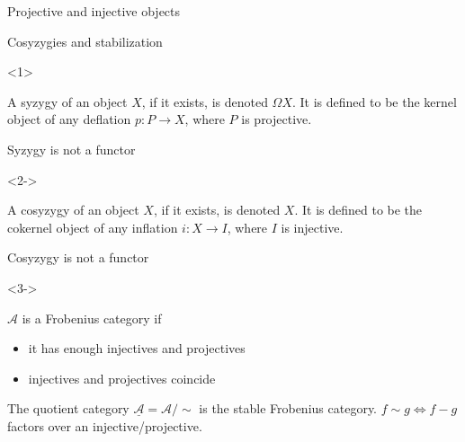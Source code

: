 \documentclass{beamer}
\newcommand{\upside}[1]{\rotatebox[origin=c]{180}{#1}}
\begin{document}
\begin{frame}{Projective and injective objects}
\begin{onlyenv}
\begin{lemma}
                        \begin{center}
                        \end{center}
                    \end{lemma}
                \end{onlyenv}
            \end{frame}
            \begin{frame}{Cosyzygies and stabilization}
                \begin{onlyenv}<1>
                    \begin{definition}[Zysygy]
                        A syzygy of an object $X$, if it exists, is denoted $\Omega X$. It is defined to be the kernel object of any deflation $p:P\rightarrow X$, where $P$ is projective.
                    \end{definition}
                    \alert<1>{Syzygy is not a functor}
                \end{onlyenv}
                \begin{onlyenv}<2->
                    \begin{definition}[Cosyzygy]
                        A cosyzygy of an object $X$, if it exists, is denoted \upside{$\Omega$}$X$. It is defined to be the cokernel object of any inflation $i:X\rightarrow I$, where $I$ is injective.
                    \end{definition}
                    \alert<2>{Cosyzygy is not a functor}
                \end{onlyenv}
                \begin{onlyenv}<3->
                    \begin{definition}
                        $\mathcal{A}$ is a Frobenius category if
                        \begin{itemize}
                            \item it has enough injectives and projectives
                            \item injectives and projectives coincide
                        \end{itemize}

                        The quotient category $\underline{\mathcal{A}}=\mathcal{A}/\sim$ is the stable Frobenius category. $f\sim g \iff f-g$ factors over an injective/projective.
                    \end{definition}
                \end{onlyenv}
            \end{frame}
\end{document}
